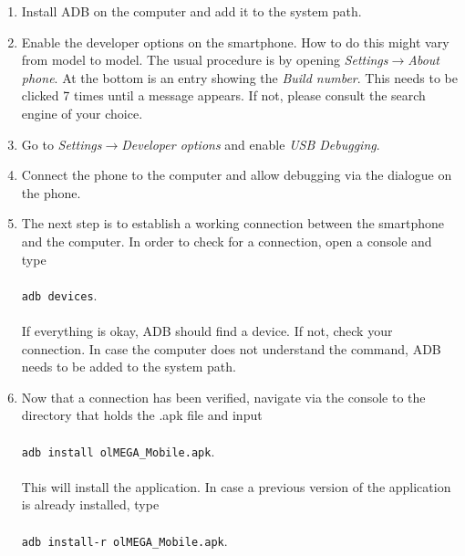 \documentclass[11pt,a4paper,titlepage]{article}
\begin{document}
\begin{enumerate}

\vspace{0.5cm}

	\item Install ADB on the computer and add it to the system path.\\
	 
	\item Enable the developer options on the smartphone. How to do this might vary from model to model. The usual procedure is by opening \textit{Settings$\rightarrow$About phone}. At the bottom is an entry showing the \textit{Build number}. This needs to be clicked 7 times until a message appears. If not, please consult the search engine of your choice.\\
	
	\item Go to \textit{Settings}$\rightarrow$\textit{Developer options} and enable \textit{USB Debugging}.\\
	
	\item Connect the phone to the computer and allow debugging via the dialogue on the phone.\\
	
	\item The next step is to establish a working connection between the smartphone and the computer. In order to check for a connection, open a console and type\\
	\\
	\colorbox{black!10}{\texttt{adb devices}}.\\
	\\
	If everything is okay, ADB should find a device. If not, check your connection. In case the computer does not understand the command, ADB needs to be added to the system path.\\
	
	\item Now that a connection has been verified, navigate via the console to the directory that holds the .apk file and input\\
	\\
	\colorbox{black!10}{\texttt{adb install olMEGA\_Mobile.apk}}.\\
	\\
	This will install the application. In case a previous version of the application is already installed, type\\
	\\
	\colorbox{black!10}{\texttt{adb install-r olMEGA\_Mobile.apk}}.\\
	

\end{enumerate}
\end{document}
